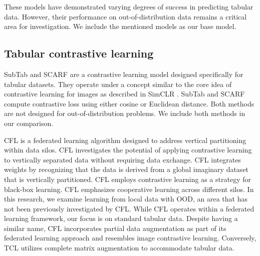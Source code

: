 These models have demonstrated varying degrees of success in predicting tabular data. However, their performance on out-of-distribution data remains a critical area for investigation. We include the mentioned models as our base model.

\subsection{Tabular contrastive learning}
    SubTab \citep{subtab} and SCARF \citep{scarf} are a contrastive learning model designed specifically for tabular datasets. They operate under a concept similar to the core idea of contrastive learning for images as described in SimCLR \citep{Chen2020SimClr}. SubTab and SCARF compute contrastive loss using either cosine or Euclidean distance. Both methods are not designed for out-of-distribution problems. We include both methods in our comparison.
    
    CFL \citep{anonymizedMethod} is a federated learning algorithm designed to address vertical partitioning within data silos. CFL investigates the potential of applying contrastive learning to vertically separated data without requiring data exchange. CFL integrates weights by recognizing that the data is derived from a global imaginary dataset that is vertically partitioned. CFL employs contrastive learning as a strategy for black-box learning. CFL emphasizes cooperative learning across different silos. In this research, we examine learning from local data with OOD, an area that has not been previously investigated by CFL. While CFL operates within a federated learning framework, our focus is on standard tabular data. Despite having a similar name, CFL incorporates partial data augmentation as part of its federated learning approach and resembles image contrastive learning. Conversely, TCL utilizes complete matrix augmentation to accommodate tabular data.
%